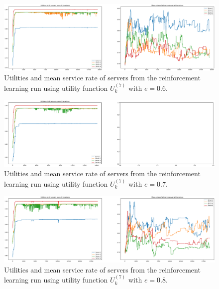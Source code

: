 \begin{figure}[H]
    \includegraphics[width=\textwidth]{chapters/00_appendix/03_more_rl_results/Bin/utility_7_eps/u7_1_e06.eps}
    \caption{Utilities and mean service rate of servers from the reinforcement
    learning run using utility function \(U_k^{(7)}\) with \(e = 0.6\).}
    \label{fig:RL_utility7_1_e06}
\end{figure}


\begin{figure}[H]
    \includegraphics[width=\textwidth]{chapters/00_appendix/03_more_rl_results/Bin/utility_7_eps/u7_1_e07.eps}
    \caption{Utilities and mean service rate of servers from the reinforcement
    learning run using utility function \(U_k^{(7)}\) with \(e = 0.7\).}
    \label{fig:RL_utility7_1_e07}
\end{figure}


\begin{figure}[H]
    \includegraphics[width=\textwidth]{chapters/00_appendix/03_more_rl_results/Bin/utility_7_eps/u7_1_e08.eps}
    \caption{Utilities and mean service rate of servers from the reinforcement
    learning run using utility function \(U_k^{(7)}\) with \(e = 0.8\).}
    \label{fig:RL_utility7_1_e08}
\end{figure}


